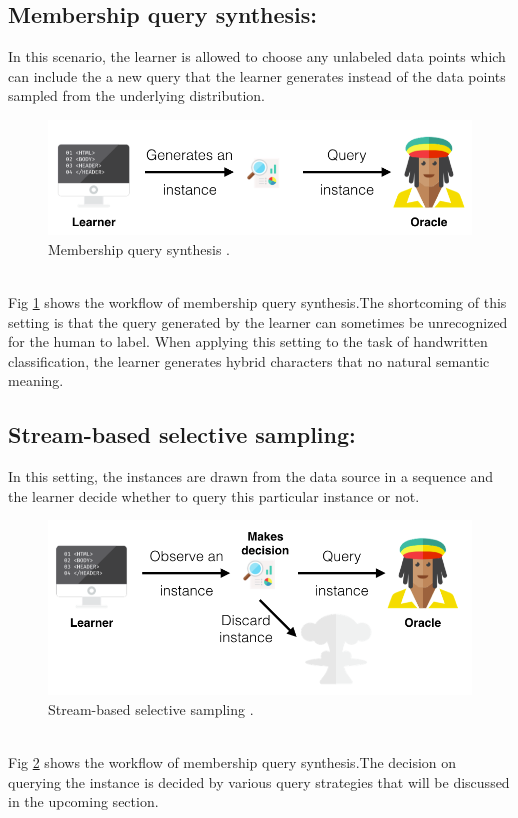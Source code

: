 \subsection{Membership query synthesis:}
	In this scenario, the learner is allowed to choose any unlabeled data points which can include the a new query that the learner generates instead of the data points sampled from the underlying distribution. \\
\begin{figure}[h!]
	\centering
	\includegraphics[scale=0.4]{images/membership}
	\caption{Membership query synthesis \cite{active_learning_datacamp}.}
	\label{membership}
\end{figure}\\
Fig \ref{membership} shows the workflow of membership query synthesis.The shortcoming of this setting is that the query generated by the learner can sometimes be unrecognized for the human to label. When applying this setting to the task of handwritten classification, the learner generates hybrid characters that no natural semantic meaning. \cite{Settles2010}
\subsection{Stream-based selective sampling:}
    In this setting, the instances are drawn from the data source in a sequence and the learner decide whether to query this particular instance or not. \\
\begin{figure}[h!]
	\centering
	\includegraphics[scale=0.4]{images/stream_based}
	\caption{Stream-based selective sampling \cite{active_learning_datacamp}.}
	\label{stream_based}
\end{figure}\\
Fig \ref{stream_based} shows the workflow of membership query synthesis.The decision on querying the instance is decided by various query strategies that will be discussed in the upcoming section. \cite{Settles2010}
    
